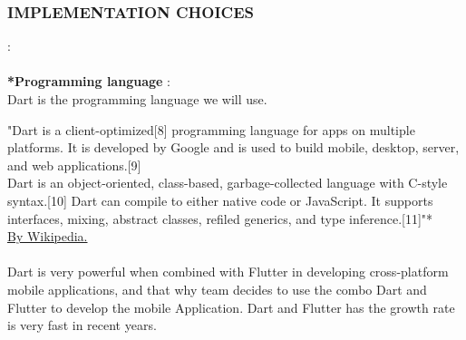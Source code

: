 \documentclass{article}
\begin{document}
\subsubsection{IMPLEMENTATION CHOICES} : \\ \\
\textbf{*Programming language} :\\
Dart is the programming language we will use.

"Dart is a client-optimized[8] programming language for apps on multiple platforms. It is developed by Google and is used to build mobile, desktop, server, and web applications.[9] \\
Dart is an object-oriented, class-based, garbage-collected language with C-style syntax.[10] Dart can compile to either native code or JavaScript. It supports interfaces, mixing, abstract classes, refiled generics, and type inference.[11]"* \\
\href{https://en.wikipedia.org/wiki/Dart_(programming_language)}{By Wikipedia.}\\\\
Dart is very powerful when combined with Flutter in developing cross-platform mobile applications, and that why team decides to use the combo Dart and Flutter to develop the mobile Application.
Dart and Flutter has the growth rate is very fast in recent years.
\end{document}
